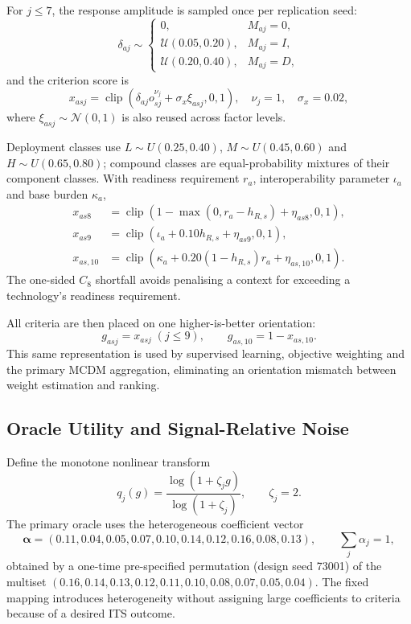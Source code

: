 \documentclass[runningheads]{llncs}
\newcommand{\clip}{\operatorname{clip}}
\begin{document}
For $j\le7$, the response amplitude is sampled once per replication seed:
\begin{equation}
\delta_{aj}\sim
\begin{cases}
0, & M_{aj}=0,\\
\mathcal U(0.05,0.20), & M_{aj}=I,\\
\mathcal U(0.20,0.40), & M_{aj}=D,
\end{cases}
\label{eq:effectbands}
\end{equation}
and the criterion score is
\begin{equation}
x_{asj}=\clip\!\left(\delta_{aj}o_{sj}^{\nu_j}+\sigma_x\xi_{asj},0,1\right),
\quad \nu_j=1,\quad \sigma_x=0.02,
\label{eq:responses}
\end{equation}
where $\xi_{asj}\sim\mathcal N(0,1)$ is also reused across factor levels.

Deployment classes use $L\sim U(0.25,0.40)$, $M\sim U(0.45,0.60)$ and
$H\sim U(0.65,0.80)$; compound classes are equal-probability mixtures of their component
classes. With readiness requirement $r_a$, interoperability parameter $\iota_a$ and base
burden $\kappa_a$,
\begin{align}
x_{as8}&=\clip\!\left(1-\max(0,r_a-h_{R,s})+\eta_{as8},0,1\right), \label{eq:c8}\\
x_{as9}&=\clip\!\left(\iota_a+0.10h_{R,s}+\eta_{as9},0,1\right), \label{eq:c9}\\
x_{as,10}&=\clip\!\left(\kappa_a+0.20(1-h_{R,s})r_a+\eta_{as,10},0,1\right). \label{eq:c10}
\end{align}
The one-sided $C_8$ shortfall avoids penalising a context for exceeding a technology's readiness
requirement.

All criteria are then placed on one higher-is-better orientation:
\begin{equation}
g_{asj}=x_{asj}\;(j\le9),
\qquad
g_{as,10}=1-x_{as,10}.
\label{eq:orientation}
\end{equation}
This same representation is used by supervised learning, objective weighting and the primary
MCDM aggregation, eliminating an orientation mismatch between weight estimation and ranking.

\subsection{Oracle Utility and Signal-Relative Noise}

Define the monotone nonlinear transform
\begin{equation}
q_j(g)=\frac{\log(1+\zeta_j g)}{\log(1+\zeta_j)},
\qquad \zeta_j=2.
\label{eq:qtransform}
\end{equation}
The primary oracle uses the heterogeneous coefficient vector
\begin{equation}
\boldsymbol\alpha
=(0.11,0.04,0.05,0.07,0.10,0.14,0.12,0.16,0.08,0.13),
\qquad \sum_j\alpha_j=1,
\label{eq:alpha}
\end{equation}
obtained by a one-time pre-specified permutation (design seed 73001) of the multiset
$(0.16,0.14,0.13,0.12,0.11,0.10,0.08,0.07,0.05,0.04)$. The fixed mapping introduces
heterogeneity without assigning large coefficients to criteria because of a desired ITS outcome.
\end{document}
